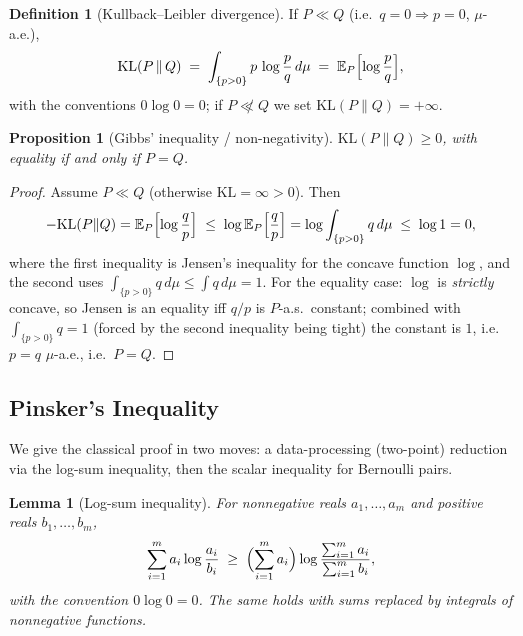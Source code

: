 \documentclass[11pt,a4paper]{article}
\theoremstyle{definition}
\newtheorem{definition}{Definition}[section]
\theoremstyle{plain}
\newtheorem{proposition}{Proposition}[section]
\newtheorem{lemma}{Lemma}[section]
\newcommand{\E}{\mathbb{E}}
\newcommand{\KL}{\mathrm{KL}}
\begin{document}
\begin{definition}[Kullback--Leibler divergence]
\label{def:dd1-kl}
If $P \ll Q$ (i.e.\ $q = 0 \Rightarrow p = 0$, $\mu$-a.e.),
\begin{equation}
\label{eq:dd1-kl-def}
\KL(P \,\|\, Q) \;=\; \int_{\{p > 0\}} p \,\log \frac{p}{q} \, d\mu
\;=\; \E_P\Bigl[ \log \frac{p}{q} \Bigr],
\end{equation}
with the conventions $0 \log 0 = 0$; if $P \not\ll Q$ we set
$\KL(P\|Q) = +\infty$.
\end{definition}

\begin{proposition}[Gibbs' inequality / non-negativity]
\label{prop:dd1-gibbs}
$\KL(P \| Q) \ge 0$, with equality if and only if $P = Q$.
\end{proposition}

\begin{proof}
Assume $P \ll Q$ (otherwise $\KL = \infty > 0$). Then
\[
-\KL(P\|Q) = \E_P\Bigl[ \log \frac{q}{p} \Bigr]
\;\le\; \log \E_P\Bigl[ \frac{q}{p} \Bigr]
= \log \int_{\{p > 0\}} q \, d\mu
\;\le\; \log 1 = 0,
\]
where the first inequality is Jensen's inequality for the concave function
$\log$, and the second uses $\int_{\{p>0\}} q\, d\mu \le \int q \, d\mu = 1$.
For the equality case: $\log$ is \emph{strictly} concave, so Jensen is an
equality iff $q/p$ is $P$-a.s.\ constant; combined with
$\int_{\{p>0\}} q = 1$ (forced by the second inequality being tight) the
constant is $1$, i.e.\ $p = q$ $\mu$-a.e., i.e.\ $P = Q$.
\end{proof}

\subsection{Pinsker's Inequality}

We give the classical proof \cite{tsybakov2009introduction} in two moves: a
data-processing (two-point) reduction via the log-sum inequality, then the
scalar inequality for Bernoulli pairs.

\begin{lemma}[Log-sum inequality]
\label{lem:dd1-logsum}
For nonnegative reals $a_1, \dots, a_m$ and positive reals
$b_1, \dots, b_m$,
\begin{equation}
\label{eq:dd1-logsum}
\sum_{i=1}^m a_i \log \frac{a_i}{b_i}
\;\ge\; \Bigl( \sum_{i=1}^m a_i \Bigr)
\log \frac{\sum_{i=1}^m a_i}{\sum_{i=1}^m b_i},
\end{equation}
with the convention $0 \log 0 = 0$. The same holds with sums replaced by
integrals of nonnegative functions.
\end{lemma}
\end{document}
